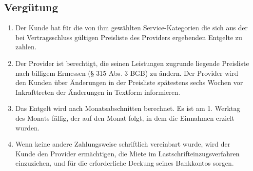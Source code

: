 \documentclass{terms}
\begin{document}
\subsection{Vergütung}
\begin{enumerate}
\item Der Kunde hat für die von ihm gewählten Service-Kategorien die sich aus der bei Vertragsschluss gültigen Preisliste des Providers ergebenden Entgelte zu zahlen.
\item Der Provider ist berechtigt, die seinen Leistungen zugrunde liegende Preisliste nach billigem Ermessen (§ 315 Abs. 3 BGB) zu ändern. Der Provider wird den Kunden über Änderungen in der Preisliste spätestens sechs Wochen vor Inkrafttreten der Änderungen in Textform informieren.
\item Das Entgelt wird nach Monatsabschnitten berechnet. Es ist am 1. Werktag des Monats fällig, der auf den Monat folgt, in dem die Einnahmen erzielt wurden.
\item Wenn keine andere Zahlungsweise schriftlich vereinbart wurde, wird der Kunde den Provider ermächtigen, die Miete im Lastschrifteinzugsverfahren einzuziehen, und für die erforderliche Deckung seines Bankkontos sorgen.
\end{enumerate}
\end{document}

